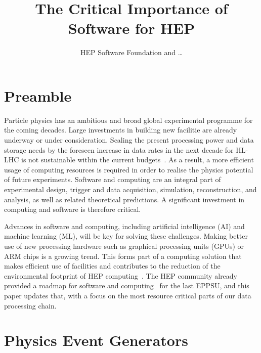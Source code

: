 \documentclass[10pt,a4paper]{article}
\begin{document}

\title{The Critical Importance of Software for HEP}

\author{HEP Software Foundation and \dots}

\maketitle


\newpage

\section{Preamble}\label{preamble}

Particle physics has an ambitious and broad global experimental programme for
the coming decades. Large investments in building new facilitie are already
underway or under consideration. Scaling the present processing power and data
storage needs by the foreseen increase in data rates in the next decade for
HL-LHC is not sustainable within the current
budgets~\cite{CERN-LHCC-2022-005,Software:2815292}. As a result, a more
efficient usage of computing resources is required in order to realise the
physics potential of future experiments. Software and computing are an integral
part of experimental design, trigger and data acquisition, simulation,
reconstruction, and analysis, as well as related theoretical predictions. A
significant investment in computing and software is therefore critical.

Advances in software and computing, including artificial intelligence (AI) and
machine learning (ML), will be key for solving these challenges. Making better
use of new processing hardware such as graphical processing units (GPUs) or ARM
chips is a growing trend. This forms part of a computing solution that makes
efficient use of facilities and contributes to the reduction of the
environmental footprint of HEP computing~\cite{wlcgsust}. The HEP community
already provided a roadmap for software and computing~\cite{hsfcwp} for the last
EPPSU, and this paper updates that, with a focus on the most resource critical
parts of our data processing chain.

\section{Physics Event Generators}\label{physics-event-generators}
\end{document}

